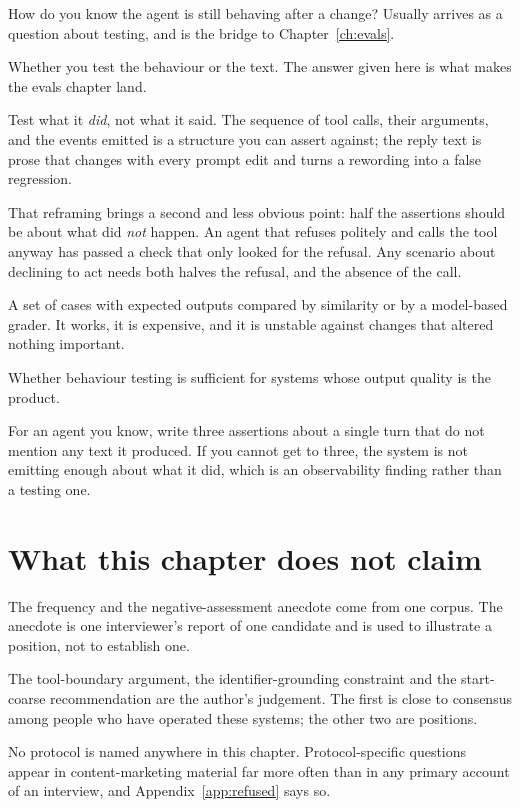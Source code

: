 \begin{bankq}{How do you know the agent is still behaving after a change?}
\qasked
Usually arrives as a question about testing, and is the bridge to
Chapter~\ref{ch:evals}.

\qtested
Whether you test the behaviour or the text. The answer given here is what makes
the evals chapter land.

\qstaff
Test what it \emph{did}, not what it said. The sequence of tool calls, their
arguments, and the events emitted is a structure you can assert against; the
reply text is prose that changes with every prompt edit and turns a rewording
into a false regression.

That reframing brings a second and less obvious point: half the assertions
should be about what did \emph{not} happen. An agent that refuses politely and
calls the tool anyway has passed a check that only looked for the refusal. Any
scenario about declining to act needs both halves \dash{} the refusal, and the
absence of the call.

\qsenior
A set of cases with expected outputs compared by similarity or by a model-based
grader. It works, it is expensive, and it is unstable against changes that
altered nothing important.

\qcontested
Whether behaviour testing is sufficient for systems whose output quality is the
product. 

\qdrill
For an agent you know, write three assertions about a single turn that do not
mention any text it produced. If you cannot get to three, the system is not
emitting enough about what it did, which is an observability finding rather
than a testing one.
\end{bankq}

\section*{What this chapter does not claim}

The frequency and the negative-assessment anecdote come from one corpus. The
anecdote is one interviewer's report of one candidate and is used to illustrate
a position, not to establish one.

The tool-boundary argument, the identifier-grounding constraint and the
start-coarse recommendation are the author's judgement. The first is close to
consensus among people who have operated these systems; the other two are
positions.

No protocol is named anywhere in this chapter. Protocol-specific questions
appear in content-marketing material far more often than in any primary account
of an interview, and Appendix~\ref{app:refused} says so.
